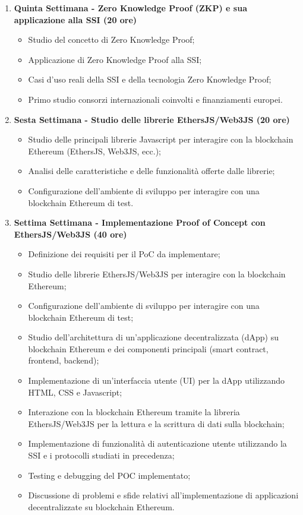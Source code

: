 {\begin{enumerate}
        \newpage 

        \item \textbf{Quinta Settimana - Zero Knowledge Proof (ZKP) e sua applicazione alla SSI (20 ore)}
        \begin{itemize}
            \item Studio del concetto di Zero Knowledge Proof;
            \item Applicazione di Zero Knowledge Proof alla SSI;
            \item Casi d'uso reali della SSI e della tecnologia Zero Knowledge Proof;
            \item Primo studio consorzi internazionali coinvolti e finanziamenti europei.
        \end{itemize}
        
        \item \textbf{Sesta Settimana - Studio delle librerie EthersJS/Web3JS (20 ore)}
        \begin{itemize}
            \item Studio delle principali librerie Javascript per interagire con la blockchain Ethereum (EthersJS, Web3JS, ecc.);
            \item Analisi delle caratteristiche e delle funzionalità offerte dalle librerie;
            \item Configurazione dell'ambiente di sviluppo per interagire con una blockchain Ethereum di test.
        \end{itemize}
        
        \item \textbf{Settima Settimana - Implementazione Proof of Concept con EthersJS/Web3JS (40 ore)}
        \begin{itemize}
            \item Definizione dei requisiti per il PoC da implementare;
            \item Studio delle librerie EthersJS/Web3JS per interagire con la blockchain Ethereum;
            \item Configurazione dell'ambiente di sviluppo per interagire con una blockchain Ethereum di test;
            \item Studio dell'architettura di un'applicazione decentralizzata (dApp) su blockchain Ethereum e dei componenti principali (smart contract, frontend, backend);
            \item Implementazione di un'interfaccia utente (UI) per la dApp utilizzando HTML, CSS e Javascript;
            \item Interazione con la blockchain Ethereum tramite la libreria EthersJS/Web3JS per la lettura e la scrittura di dati sulla blockchain;
            \item Implementazione di funzionalità di autenticazione utente utilizzando la SSI e i protocolli studiati in precedenza;
            \item Testing e debugging del POC implementato;
            \item Discussione di problemi e sfide relativi all'implementazione di applicazioni decentralizzate su blockchain Ethereum.
        \end{itemize}


\end{enumerate}}
